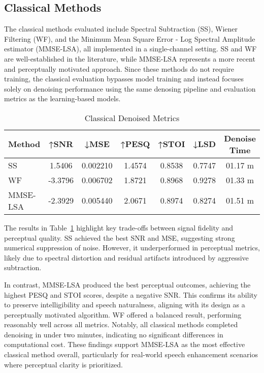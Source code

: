 \subsection{Classical Methods}
\label{sec:classical_methods}

The classical methods evaluated include Spectral Subtraction (SS), Wiener Filtering (WF), and the Minimum Mean Square Error - Log Spectral Amplitude estimator (MMSE-LSA), all implemented in a single-channel setting. SS and WF are well-established in the literature, while MMSE-LSA represents a more recent and perceptually motivated approach. Since these methods do not require training, the classical evaluation bypasses model training and instead focuses solely on denoising performance using the same denosing pipeline and evaluation metrics as the learning-based models.


\vspace{1em}
\begin{table}[H]
\centering
\caption{Classical Denoised Metrics}
\label{tab:classical_metrics}
\begin{tabular}{|l|c|c|c|c|c|c|}
\hline
\textbf{Method} & \textbf{↑SNR} & \textbf{↓MSE} & \textbf{↑PESQ} & \textbf{↑STOI} & \textbf{↓LSD} & \textbf{Denoise Time} \\
\hline
SS          & 1.5406 & 0.002210 & 1.4574 & 0.8538 & 0.7747 & 01.17 m \\
WF          & -3.3796 & 0.006702 & 1.8721 & 0.8968 & 0.9278 & 01.33 m \\
MMSE-LSA    & -2.3929 & 0.005440 & 2.0671 & 0.8974 & 0.8274 & 01.51 m \\
\hline
\end{tabular}
\end{table}


The results in Table~\ref{tab:classical_metrics} highlight key trade-offs between signal fidelity and perceptual quality. SS achieved the best SNR and MSE, suggesting strong numerical suppression of noise. However, it underperformed in perceptual metrics, likely due to spectral distortion and residual artifacts introduced by aggressive subtraction.

In contrast, MMSE-LSA produced the best perceptual outcomes, achieving the highest PESQ and STOI scores, despite a negative SNR. This confirms its ability to preserve intelligibility and speech naturalness, aligning with its design as a perceptually motivated algorithm. WF offered a balanced result, performing reasonably well across all metrics. Notably, all classical methods completed denoising in under two minutes, indicating no significant differences in computational cost. These findings support MMSE-LSA as the most effective classical method overall, particularly for real-world speech enhancement scenarios where perceptual clarity is prioritized.

